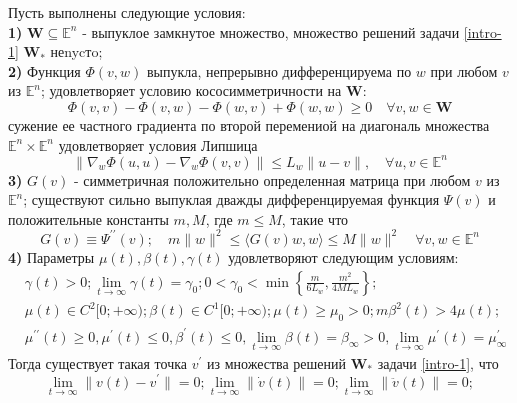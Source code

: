 \begin{theo} Пусть выполнены следующие условия:\\
\textbf{1)} $\mathbf{W} \subseteq \mathbb{E}^{n}$ - выпуклое замкнутое множество, множество решений задачи \eqref{intro-1} $\mathbf{W_{*}}$ неnycтo; \\
\textbf{2)} Функция $\Phi(v,w)$ выпукла, непрерывно дифференцируема по $w$ при любом $v $ из $ \mathbb{E}^{n} $; удовлетворяет условию кососимметричности на $\mathbf{W}$:
\begin{equation*}
\Phi(v, v)-\Phi(v, w)-\Phi(w, v)+\Phi(w, w) \geqslant 0 \quad \forall v, w \in \mathbf{W}
\end{equation*}
сужение ее частного градиента по второй перемениой на диагональ множества $ \mathbb{E}^{n} \times \mathbb{E}^{n}$ удовлетворяет условия Липшица
\begin{equation*}
\left\|\nabla_{w} \Phi(u, u)-\nabla_{w} \Phi(v, v)\right\| \leqslant L_{w}\|u-v\|, \quad \forall u, v \in \mathbb{E}^{n}
\end{equation*}
\textbf{3)} $G(v)$ - симметричная положительно определенная матрица при любом $v$ из $\mathbb{E}^n$; существуют сильно выпуклая дважды дифференцируемая функция $\Psi(v)$ и положительные константы $m, M$, где $m \leqslant M$, такие что
\begin{equation*}
G(v) \equiv \Psi^{\prime \prime}(v) ; \quad m\|w\|^{2} \leqslant\langle G(v) w, w\rangle \leqslant M\|w\|^{2} \quad \forall v, w \in \mathbb{E}^{n}
\end{equation*}
\textbf{4)} Параметры $\mu(t), \beta(t), \gamma(t) $ удовлетворяют следующим условиям:
\begin{equation*}
\begin{aligned}
&\gamma(t)>0 ; \lim _{t \rightarrow \infty} \gamma(t)=\gamma_{0} ; 0<\gamma_{0}<\min \left\{\frac{m}{6 L_{w}}, \frac{m^{2}}{4 M L_{w}}\right\};\\
&\mu(t) \in C^{2}[0 ;+\infty) ; \beta(t) \in C^{1}[0 ;+\infty) ; \mu(t) \geqslant \mu_{0}>0 ; m \beta^{2}(t)>4 \mu(t);\\
&\mu^{\prime \prime}(t) \geqslant 0, \mu^{\prime}(t) \leqslant 0, \beta^{\prime}(t) \leqslant 0, \lim _{t \rightarrow \infty} \beta(t)=\beta_{\infty}>0, \lim _{t \rightarrow \infty}\mu^{\prime}(t)=\mu_{\infty}^{\prime} 
\end{aligned}
\end{equation*}
Тогда существует такая точка $v^{\prime}$ из множества решений $\mathbf{W_{*}}$ задачи \eqref{intro-1}, что 
\begin{equation*}
\lim\limits_{t\to\infty}\|v(t)-v^{\prime}\|=0;\lim\limits_{t\to\infty}\|\dot{v}(t)\|=0;\lim\limits_{t\to\infty}\|\ddot{v}(t)\|=0;
\end{equation*}

\end{theo}

